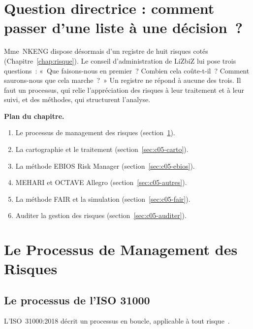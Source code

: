 \bigskip

\section*{Question directrice : comment passer d'une liste à une décision~?}

Mme~NKENG dispose désormais d'un registre de huit risques cotés
(Chapitre~\ref{chap:risque}). Le conseil d'administration de LiZbiZ lui pose
trois questions~: «~Que faisons-nous en premier~? Combien cela coûte-t-il~?
Comment saurons-nous que cela marche~?~» Un registre ne répond à aucune des
trois. Il faut un processus, qui relie l'appréciation des risques à leur
traitement et à leur suivi, et des méthodes, qui structurent l'analyse.

\medskip
\textbf{Plan du chapitre.}
\begin{enumerate}
    \item Le processus de management des risques
          (section~\ref{sec:c05-processus}).
    \item La cartographie et le traitement
          (section~\ref{sec:c05-carto}).
    \item La méthode EBIOS Risk Manager (section~\ref{sec:c05-ebios}).
    \item MEHARI et OCTAVE Allegro (section~\ref{sec:c05-autres}).
    \item La méthode FAIR et la simulation (section~\ref{sec:c05-fair}).
    \item Auditer la gestion des risques (section~\ref{sec:c05-auditer}).
\end{enumerate}

\separateur

\section{Le Processus de Management des Risques}
\label{sec:c05-processus}

\subsection{Le processus de l'ISO 31000}

L'ISO~31000:2018 décrit un processus en boucle, applicable à tout
risque~\cite{iso31000_2018}.

